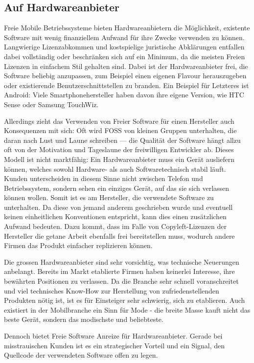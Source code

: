 \subsection{Auf Hardwareanbieter}
Freie Mobile Betriebssysteme bieten Hardwareanbietern die Möglichkeit, existente Software mit wenig finanziellem Aufwand für ihre Zwecke verwenden zu können. Langwierige Lizenzabkommen und kostspielige juristische Abklärungen entfallen dabei vollständig oder beschränken sich auf ein Minimum, da die meisten Freien Lizenzen in einfachem Stil gehalten sind. Dabei ist der Hardwareanbieter frei, die Software beliebig anzupassen, zum Beispiel einen eigenen Flavour herauszugeben oder existierende Benutzerschnittstellen zu branden. Ein Beispiel für Letzteres ist Android: Viele Smartphonehersteller haben davon ihre eigene Version, wie HTC Sense oder Samsung TouchWiz.

Allerdings zieht das Verwenden von Freier Software für einen Hersteller auch Konsequenzen mit sich: Oft wird FOSS von kleinen Gruppen unterhalten, die daran nach Lust und Laune schreiben --- die Qualität der Software hängt allzu oft von der Motivation und Tageslaune der freiwilligen Entwickler ab. Dieses Modell ist nicht marktfähig: Ein Hardwareanbieter muss ein Gerät ausliefern können, welches sowohl Hardware- als auch Softwaretechnisch stabil läuft. Kunden unterscheiden in diesem Sinne nicht zwischen Telefon und Betriebssystem, sondern sehen ein einziges Gerät, auf das sie sich verlassen können wollen. Somit ist es am Hersteller, die verwendete Software zu unterhalten. Da diese von jemand anderem geschrieben wurde und eventuell keinen einheitlichen Konventionen entspricht, kann dies einen zusätzlichen Aufwand bedeuten. Dazu kommt, dass im Falle von Copyleft-Lizenzen der Hersteller die getane Arbeit ebenfalls frei bereitstellen muss, wodurch andere Firmen das Produkt einfacher replizieren können.

Die grossen Hardwareanbieter sind sehr vorsichtig, was technische Neuerungen anbelangt. Bereits im Markt etablierte Firmen haben keinerlei Interesse, ihre bewährten Positionen zu verlassen. Da die Branche sehr schnell voranschreitet und viel technisches Know-How zur Herstellung von zufriedenstellenden Produkten nötig ist, ist es für Einsteiger sehr schwierig, sich zu etablieren. Auch existiert in der Mobilbranche ein Sinn für Mode - die breite Masse kauft nicht das beste Gerät, sondern das modischste und beliebteste.

Dennoch bietet Freie Software Anreize für Hardwareanbieter. Gerade bei misstrauischen Kunden ist es ein strategischer Vorteil und ein Signal, den Quellcode der verwendeten Software offen zu legen.
\columnbreak

